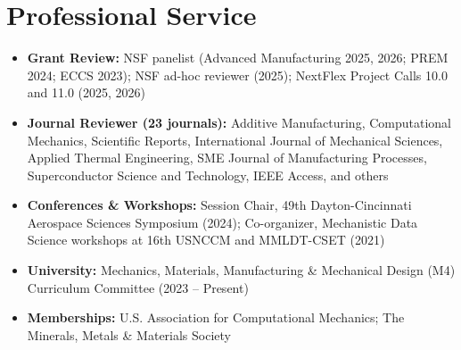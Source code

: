 \documentclass[10pt, letterpaper]{article}
\begin{document}
\section{Professional Service}
    \begin{itemize}
        \item \textbf{Grant Review:} NSF panelist (Advanced Manufacturing 2025, 2026; PREM 2024; ECCS 2023); NSF ad-hoc reviewer (2025); NextFlex Project Calls 10.0 and 11.0 (2025, 2026)
        \item \textbf{Journal Reviewer (23 journals):} Additive Manufacturing, Computational Mechanics, Scientific Reports, International Journal of Mechanical Sciences, Applied Thermal Engineering, SME Journal of Manufacturing Processes, Superconductor Science and Technology, IEEE Access, and others
        \item \textbf{Conferences \& Workshops:} Session Chair, 49th Dayton-Cincinnati Aerospace Sciences Symposium (2024); Co-organizer, Mechanistic Data Science workshops at 16th USNCCM and MMLDT-CSET (2021)
        \item \textbf{University:} Mechanics, Materials, Manufacturing \& Mechanical Design (M4) Curriculum Committee (2023 -- Present)
        \item \textbf{Memberships:} U.S. Association for Computational Mechanics; The Minerals, Metals \& Materials Society
    \end{itemize}
\end{document}
